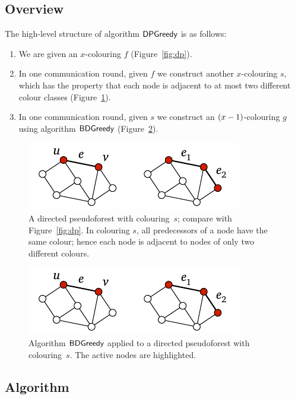 \subsection{Overview}

The high-level structure of algorithm $\textsf{DPGreedy}$ is as follows:
\begin{enumerate}
    \item We are given an $x$-colouring $f$ (Figure~\ref{fig:dp}).
    \item In one communication round, given $f$ we construct another $x$-colouring $s$, which has the property that each node is adjacent to at most two different colour classes (Figure~\ref{fig:dpsuccessor}).
    \item In one communication round, given $s$ we construct an $(x-\nobreak 1)$-colouring $g$ using algorithm $\textsf{BDGreedy}$ (Figure~\ref{fig:dpgreedy}).
\end{enumerate}

\begin{figure}
    \centering
    \includegraphics[page=\PDPSuccessor]{figs.pdf}
    \caption{A directed pseudoforest with colouring~$s$; compare with Figure~\ref{fig:dp}. In colouring $s$, all predecessors of a node have the same colour; hence each node is adjacent to nodes of only two different colours.}\label{fig:dpsuccessor}
\end{figure}

\begin{figure}
    \centering
    \includegraphics[page=\PDPGreedy]{figs.pdf}
    \caption{Algorithm $\textsf{BDGreedy}$ applied to a directed pseudoforest with colouring~$s$. The active nodes are highlighted.}\label{fig:dpgreedy}
\end{figure}


\subsection{Algorithm}

